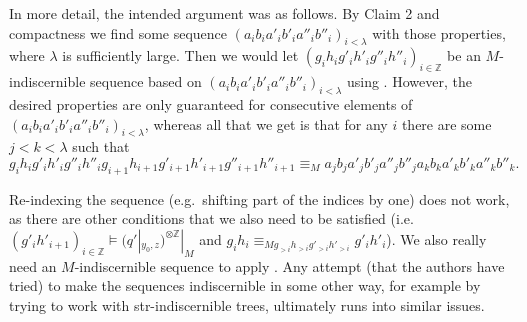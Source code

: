 \documentclass[a4paper, reqno]{amsart}
\theoremstyle{definition}
\theoremstyle{repeat}
\newcommand{\Z}{\mathbb{Z}}
\begin{document}
In more detail, the intended argument was as follows. By Claim 2 and compactness we find some sequence $(a_i b_i a'_i b'_i a''_i b''_i)_{i < \lambda}$ with those properties, where $\lambda$ is sufficiently large. Then we would let $(g_i h_i g'_i h'_i g''_i h''_i)_{i \in \Z}$ be an $M$-indiscernible sequence based on $(a_i b_i a'_i b'_i a''_i b''_i)_{i < \lambda}$ using \cite[Lemma 2.17]{dobrowolski_kim-independence_2022}. However, the desired properties are only guaranteed for consecutive elements of $(a_i b_i a'_i b'_i a''_i b''_i)_{i < \lambda}$, whereas all that we get is that for any $i$ there are some $j < k < \lambda$ such that
\[
g_i h_i g'_i h'_i g''_i h''_i g_{i+1} h_{i+1} g'_{i+1} h'_{i+1} g''_{i+1} h''_{i+1} \equiv_M a_j b_j a'_j b'_j a''_j b''_j a_k b_k a'_k b'_k a''_k b''_k.
\]

Re-indexing the sequence (e.g.\ shifting part of the indices by one) does not work, as there are other conditions that we also need to be satisfied (i.e.\ $(g'_i h'_{i+1})_{i \in \Z} \models (q'|_{y_0, z})^{\otimes \Z}|_M$ and $g_i h_i \equiv_{M g_{>i} h_{>i} g'_{>i} h'_{>i}} g'_i h'_i$). We also really need an $M$-indiscernible sequence to apply \cite[Lemma 2.28]{dobrowolski_kim-independence_2022}. Any attempt (that the authors have tried) to make the sequences indiscernible in some other way, for example by trying to work with str-indiscernible trees, ultimately runs into similar issues.
\end{document}
